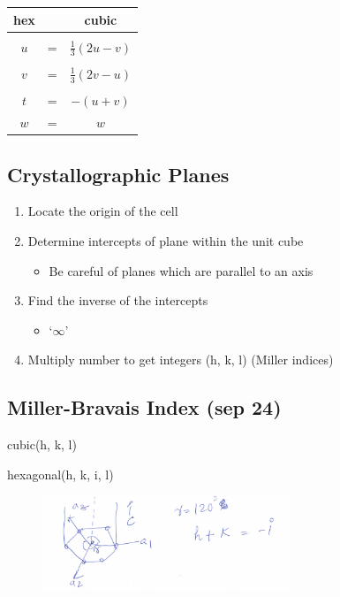 \documentclass{article}
\begin{document}
\begin{table}[h!]
    \centering
    \begin{tabular}{ccc}
        \textbf{hex} & & \textbf{cubic} \\
        \hline
        \\
        $u$ & = & $\frac{1}{3}(2u-v)$\\
        \\
        $v$ & = & $\frac{1}{3}(2v-u)$\\
        \\
        $t$ & = & $-(u+v)$\\
        $w$ & = & $w$
    \end{tabular}
    \label{tab:conversionsfromhextocubic}
\end{table}

\subsection{Crystallographic Planes}
\begin{enumerate}
    \item Locate the origin of the cell
    \item Determine intercepts of plane within the unit cube
    \begin{itemize}
        \item Be careful of planes which are parallel to an axis
    \end{itemize}
    \item Find the inverse of the intercepts
    \begin{itemize}
        \item `$\infty$'
    \end{itemize}
    \item Multiply number to get integers (h, k, l) (Miller indices)
\end{enumerate}

\subsection{Miller-Bravais Index (sep 24)}
cubic\textrightarrow (h, k, l)

hexagonal\textrightarrow (h, k, i, l)

\begin{figure}[h!]
	\centering
	\includegraphics[width=0.66\textwidth]{assets/345e202b.png}
\end{figure}
\end{document}

